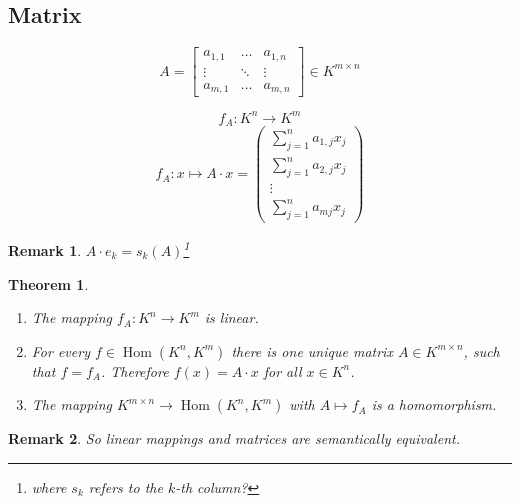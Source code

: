 \documentclass[a4paper,landscape,twocolumn]{article}
\newtheorem{theorem}{Theorem}
\newtheorem{rem}{Remark}
\DeclareMathOperator\Hom{Hom} %
\begin{document}
\subsection{Matrix}
\[
  A = \begin{bmatrix}
    a_{1,1} & \ldots & a_{1,n} \\
    \vdots & \ddots & \vdots \\
    a_{m,1} & \ldots & a_{m,n}
  \end{bmatrix}
  \in K^{m\times n}
\]

\[ f_A: K^n \rightarrow K^m \]
\[
  f_A: x \mapsto A \cdot x = \begin{pmatrix}
    \sum_{j=1}^n a_{1,j} x_j \\
    \sum_{j=1}^n a_{2,j} x_j \\
    \vdots \\
    \sum_{j=1}^n a_{mj} x_j
  \end{pmatrix}
\]

\begin{rem}
  \label{bemerkung-6.6}
  $A \cdot e_k = s_k(A)$\footnote{where $s_k$ refers to the $k$-th column?}
\end{rem}
\begin{theorem}
  \begin{enumerate}
    \item The mapping $f_A: K^n \rightarrow K^m$ is linear.
    \item For every $f \in \Hom(K^n, K^m)$ there is one unique matrix $A \in K^{m \times n}$,
      such that $f = f_A$. Therefore $f(x) = A \cdot x$ for all $x \in K^n$.
    \item The mapping $K^{m\times n} \rightarrow \Hom(K^n, K^m)$ with $A \mapsto f_A$ is a homomorphism.
  \end{enumerate}
\end{theorem}

\begin{rem}
  So linear mappings and matrices are semantically equivalent.
\end{rem}
\end{document}
